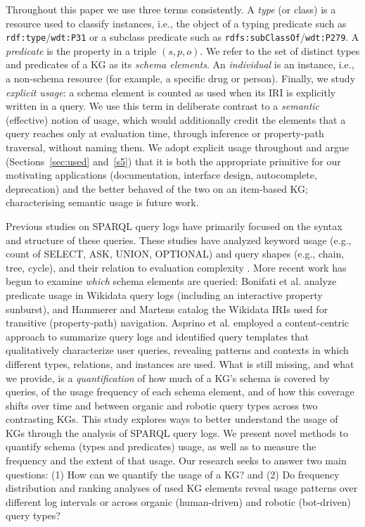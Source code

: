 \documentclass[sw]{iosart2x}
\begin{document}
Throughout this paper we use three terms consistently. A \emph{type} (or class) is a resource used to classify instances, i.e., the object of a typing predicate such as \texttt{rdf:type}/\texttt{wdt:P31} or a subclass predicate such as \texttt{rdfs:subClassOf}/\texttt{wdt:P279}. A \emph{predicate} is the property in a triple $(s,p,o)$. We refer to the set of distinct types and predicates of a KG as its \emph{schema elements}. An \emph{individual} is an instance, i.e., a non-schema resource (for example, a specific drug or person). Finally, we study \emph{explicit usage}: a schema element is counted as used when its IRI is explicitly written in a query. We use this term in deliberate contrast to a \emph{semantic} (effective) notion of usage, which would additionally credit the elements that a query reaches only at evaluation time, through inference or property-path traversal, without naming them. We adopt explicit usage throughout and argue (Sections~\ref{sec:used} and~\ref{s5}) that it is both the appropriate primitive for our motivating applications (documentation, interface design, autocomplete, deprecation) and the better behaved of the two on an item-based KG; characterising semantic usage is future work.

Previous studies on SPARQL query logs have primarily focused on the syntax and structure of these queries. These studies have analyzed keyword usage (e.g., count of SELECT, ASK, UNION, OPTIONAL) and query shapes (e.g., chain, tree, cycle), and their relation to evaluation complexity \cite{bonifati2020analytical, buil2015preliminary, saleem2015lsq,stadler2024lsq}. More recent work has begun to examine \emph{which} schema elements are queried: Bonifati et al. \cite{bonifati2019navigating} analyze predicate usage in Wikidata query logs (including an interactive property sunburst), and Hammerer and Martens \cite{hammerer2025compendium} catalog the Wikidata IRIs used for transitive (property-path) navigation. Asprino et al. \cite{asprino2023your} employed a content-centric approach to summarize query logs and identified query templates that qualitatively characterize user queries, revealing patterns and contexts in which different types, relations, and instances are used. What is still missing, and what we provide, is a \emph{quantification} of how much of a KG's schema is covered by queries, of the usage frequency of each schema element, and of how this coverage shifts over time and between organic and robotic query types across two contrasting KGs.
This study explores ways to better understand the usage of KGs through the analysis of SPARQL query logs. We present novel methods to quantify schema (types and predicates) usage, as well as to measure the frequency and the extent of that usage. Our research seeks to answer two main questions: (1) How can we quantify the usage of a KG? and (2) Do frequency distribution and ranking analyses of used KG elements reveal usage patterns over different log intervals or across organic (human-driven) and robotic (bot-driven) query types?
\end{document}
